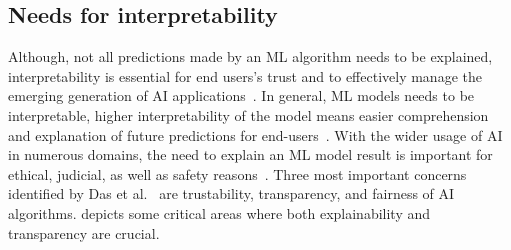 \subsection{Needs for interpretability}
Although, not all predictions made by an ML algorithm needs to be explained, interpretability is essential for end users's trust and to effectively manage the emerging generation of AI applications~\cite{das2020opportunities}. In general, ML models needs to be interpretable, higher interpretability of the model means easier comprehension and explanation of future predictions for end-users~\cite{stiglic2020interpretability}. With the wider usage of AI in numerous domains, the need to explain an ML model result is important for ethical, judicial, as well as safety reasons~\cite{das2020opportunities}. 
Three most important concerns identified by Das et al.~\cite{das2020opportunities} are trustability, transparency, and fairness of AI algorithms.  depicts some critical areas where both explainability and transparency are crucial. 

